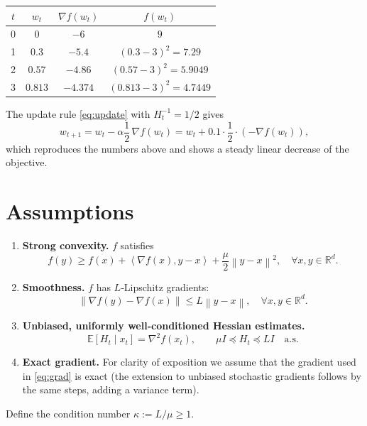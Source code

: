 \documentclass{article}
\newcommand{\E}{\mathbb{E}}
\newcommand{\R}{\mathbb{R}}
\newcommand{\norm}[1]{\left\lVert #1\right\rVert}
\newcommand{\ip}[2]{\left\langle #1,#2\right\rangle}
\begin{document}
\begin{center}
\begin{tabular}{c|c|c|c}
$t$ & $w_t$ & $\nabla f(w_t)$ & $f(w_t)$\\ \hline
0 & $0$ & $-6$ & $9$\\
1 & $0.3$ & $-5.4$ & $(0.3-3)^2=7.29$\\
2 & $0.57$ & $-4.86$ & $(0.57-3)^2=5.9049$\\
3 & $0.813$ & $-4.374$ & $(0.813-3)^2=4.7449$
\end{tabular}
\end{center}
The update rule \eqref{eq:update} with $H_t^{-1}=1/2$ gives
\[
   w_{t+1}=w_t-\alpha\frac{1}{2}\,\nabla f(w_t)
          =w_t+0.1\cdot\frac{1}{2}\cdot(-\nabla f(w_t)),
\]
which reproduces the numbers above and shows a steady linear decrease of the objective.

\newpage
\section*{Assumptions}
\begin{enumerate}[label=(A\arabic*)]
\item \textbf{Strong convexity.} $f$ satisfies
\[
   f(y)\ge f(x)+\ip{\nabla f(x)}{y-x}+\frac{\mu}{2}\norm{y-x}^{2},
   \quad\forall x,y\in\R^{d}. \tag{A1}
\]
\item \textbf{Smoothness.} $f$ has $L$‑Lipschitz gradients:
\[
   \norm{\nabla f(y)-\nabla f(x)}\le L\norm{y-x},
   \quad\forall x,y\in\R^{d}. \tag{A2}
\]
\item \textbf{Unbiased, uniformly well‑conditioned Hessian estimates.}
\[
   \E\!\left[H_t\mid x_t\right]=\nabla^{2}f(x_t),\qquad
   \mu I\preceq H_t\preceq L I\quad\text{a.s.} \tag{A3}
\]
\item \textbf{Exact gradient.} For clarity of exposition we assume that the
gradient used in \eqref{eq:grad} is exact (the extension to unbiased stochastic
gradients follows by the same steps, adding a variance term).
\end{enumerate}

Define the condition number $\kappa:=L/\mu\ge1$.
\end{document}
